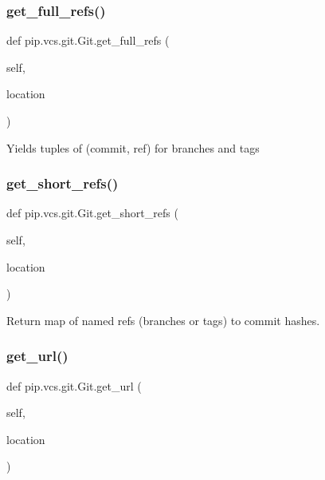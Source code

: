 \subsubsection{\texorpdfstring{get\+\_\+full\+\_\+refs()}{get\_full\_refs()}}
{\footnotesize\ttfamily def pip.\+vcs.\+git.\+Git.\+get\+\_\+full\+\_\+refs (\begin{DoxyParamCaption}\item[{}]{self,  }\item[{}]{location }\end{DoxyParamCaption})}

\begin{DoxyVerb}Yields tuples of (commit, ref) for branches and tags\end{DoxyVerb}
 \mbox{\label{classpip_1_1vcs_1_1git_1_1_git_a31f34b094034c842af0dcf29a43826cd}} 
\subsubsection{\texorpdfstring{get\+\_\+short\+\_\+refs()}{get\_short\_refs()}}
{\footnotesize\ttfamily def pip.\+vcs.\+git.\+Git.\+get\+\_\+short\+\_\+refs (\begin{DoxyParamCaption}\item[{}]{self,  }\item[{}]{location }\end{DoxyParamCaption})}

\begin{DoxyVerb}Return map of named refs (branches or tags) to commit hashes.\end{DoxyVerb}
 \mbox{\label{classpip_1_1vcs_1_1git_1_1_git_afc57b1e93b7e9446f4b0f5bde3d70be4}} 
\subsubsection{\texorpdfstring{get\+\_\+url()}{get\_url()}}
{\footnotesize\ttfamily def pip.\+vcs.\+git.\+Git.\+get\+\_\+url (\begin{DoxyParamCaption}\item[{}]{self,  }\item[{}]{location }\end{DoxyParamCaption})}

